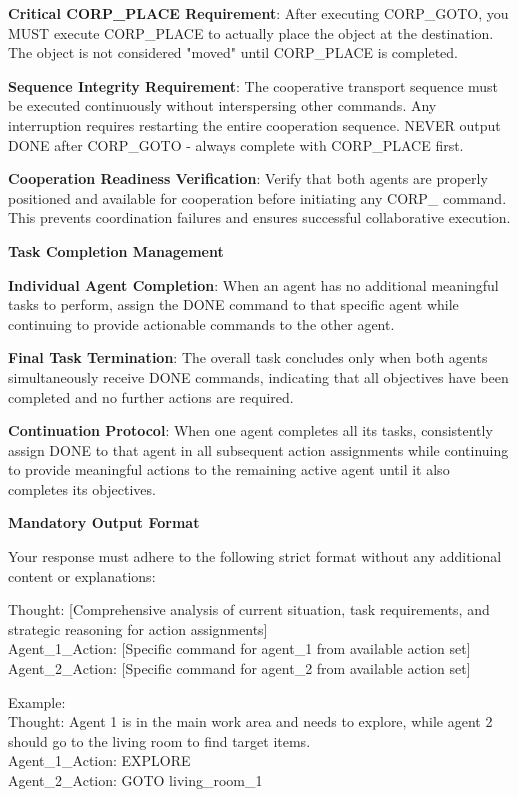 \begin{tcolorbox}
\begin{flushleft}
\textbf{Critical CORP\_PLACE Requirement}: After executing CORP\_GOTO, you MUST execute CORP\_PLACE to actually place the object at the destination. The object is not considered "moved" until CORP\_PLACE is completed.

\textbf{Sequence Integrity Requirement}: The cooperative transport sequence must be executed continuously without interspersing other commands. Any interruption requires restarting the entire cooperation sequence. NEVER output DONE after CORP\_GOTO - always complete with CORP\_PLACE first.

\textbf{Cooperation Readiness Verification}: Verify that both agents are properly positioned and available for cooperation before initiating any CORP\_ command. This prevents coordination failures and ensures successful collaborative execution.

\textbf{Task Completion Management}

\textbf{Individual Agent Completion}: When an agent has no additional meaningful tasks to perform, assign the DONE command to that specific agent while continuing to provide actionable commands to the other agent.

\textbf{Final Task Termination}: The overall task concludes only when both agents simultaneously receive DONE commands, indicating that all objectives have been completed and no further actions are required.

\textbf{Continuation Protocol}: When one agent completes all its tasks, consistently assign DONE to that agent in all subsequent action assignments while continuing to provide meaningful actions to the remaining active agent until it also completes its objectives.

\textbf{Mandatory Output Format}

Your response must adhere to the following strict format without any additional content or explanations:

Thought: [Comprehensive analysis of current situation, task requirements, and strategic reasoning for action assignments]\\
Agent\_1\_Action: [Specific command for agent\_1 from available action set]\\
Agent\_2\_Action: [Specific command for agent\_2 from available action set]

Example:\\
Thought: Agent 1 is in the main work area and needs to explore, while agent 2 should go to the living room to find target items.\\
Agent\_1\_Action: EXPLORE\\
Agent\_2\_Action: GOTO living\_room\_1


\end{flushleft}
\end{tcolorbox}
